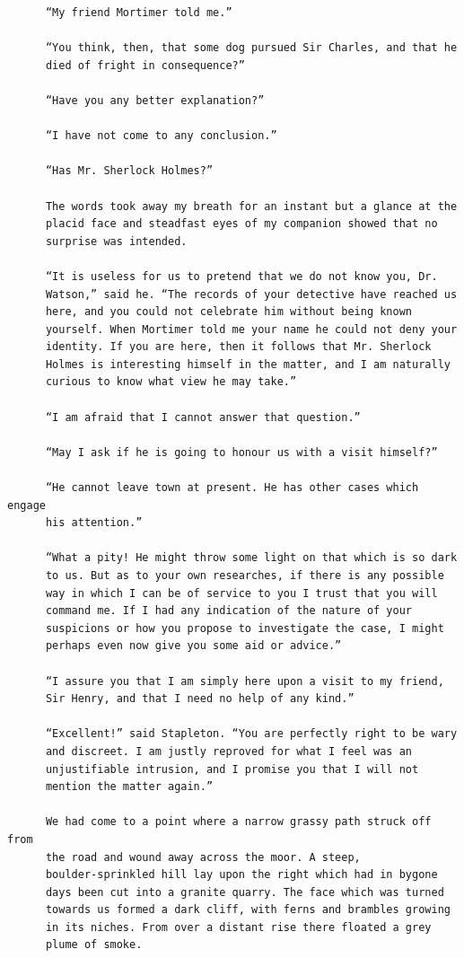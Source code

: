 \documentclass{article}
\begin{document}
\begin{verbatim}
      “My friend Mortimer told me.”

      “You think, then, that some dog pursued Sir Charles, and that he
      died of fright in consequence?”

      “Have you any better explanation?”

      “I have not come to any conclusion.”

      “Has Mr. Sherlock Holmes?”

      The words took away my breath for an instant but a glance at the
      placid face and steadfast eyes of my companion showed that no
      surprise was intended.

      “It is useless for us to pretend that we do not know you, Dr.
      Watson,” said he. “The records of your detective have reached us
      here, and you could not celebrate him without being known
      yourself. When Mortimer told me your name he could not deny your
      identity. If you are here, then it follows that Mr. Sherlock
      Holmes is interesting himself in the matter, and I am naturally
      curious to know what view he may take.”

      “I am afraid that I cannot answer that question.”

      “May I ask if he is going to honour us with a visit himself?”

      “He cannot leave town at present. He has other cases which engage
      his attention.”

      “What a pity! He might throw some light on that which is so dark
      to us. But as to your own researches, if there is any possible
      way in which I can be of service to you I trust that you will
      command me. If I had any indication of the nature of your
      suspicions or how you propose to investigate the case, I might
      perhaps even now give you some aid or advice.”

      “I assure you that I am simply here upon a visit to my friend,
      Sir Henry, and that I need no help of any kind.”

      “Excellent!” said Stapleton. “You are perfectly right to be wary
      and discreet. I am justly reproved for what I feel was an
      unjustifiable intrusion, and I promise you that I will not
      mention the matter again.”

      We had come to a point where a narrow grassy path struck off from
      the road and wound away across the moor. A steep,
      boulder-sprinkled hill lay upon the right which had in bygone
      days been cut into a granite quarry. The face which was turned
      towards us formed a dark cliff, with ferns and brambles growing
      in its niches. From over a distant rise there floated a grey
      plume of smoke.


\end{verbatim}
\end{document}
